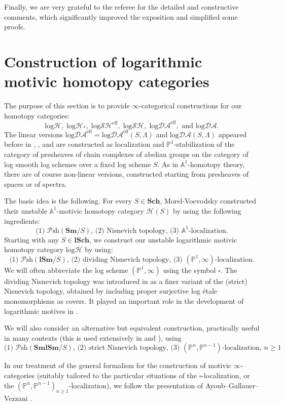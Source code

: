 \documentclass[11pt, a4paper]{amsart}
\theoremstyle{definition}
\numberwithin{equation}{subsection}
\renewcommand{\P}{\mathbb{P}}
\newcommand{\A}{\mathbb{A}}
\newcommand{\Sch}{\mathbf{Sch}}
\newcommand{\lSch}{\mathbf{lSch}}
\newcommand{\Sm}{\mathbf{Sm}}
\newcommand{\lSm}{\mathbf{lSm}}
\newcommand{\SmlSm}{\mathbf{SmlSm}}
\newcommand{\boxx}{\square}
\newcommand{\infPsh}{\mathcal{P}\mathrm{sh}}
\newcommand{\infH}{\mathcal{H}}
\newcommand{\inflogH}{\mathrm{log}\mathcal{H}}
\newcommand{\inflogHpt}{\mathrm{log}\mathcal{H}_\ast}
\newcommand{\inflogSH}{\mathrm{log}\mathcal{SH}}
\newcommand{\inflogSHS}{\mathrm{log}\mathcal{SH}^{\mathrm{eff}}}
\newcommand{\inflogDA}{\mathrm{log}\mathcal{DA}}
\newcommand{\inflogDAeff}{\mathrm{log}\mathcal{DA}^{\mathrm{eff}}}
\begin{document}
Finally, we are very grateful to the referee for the detailed and constructive comments, 
which significantly improved the exposition and simplified some proofs.

\newpage




\section{Construction of logarithmic motivic homotopy categories}
\label{section:colmhc}
The purpose of this section is to provide $\infty$-categorical constructions 
for our homotopy categories:
\[
\inflogH,
\;
\inflogHpt,
\;
\inflogSHS, 
\;
\inflogSH,
\;
\inflogDAeff,
\text{ and }
\inflogDA.
\]
The linear versions $\inflogDAeff= \inflogDAeff(S, \Lambda)$ and $\inflogDA(S, \Lambda)$ appeared before in
\cite{logDM}, \cite{BLPO}, and are constructed as localization and $\P^1$-stabilization of the category of presheaves of chain complexes of abelian groups on the category of log smooth log schemes over a fixed log scheme $S$. As in $\A^1$-homotopy theory, there are of course non-linear versions, constructed starting from presheaves of spaces or of spectra. 

The basic idea is the following. For every $S\in \Sch$, 
Morel-Voevodsky \cite{MV} constructed their unstable $\A^1$-motivic homotopy category $\infH(S)$ 
by using the following ingredients:
\[
\text{(1) $\infPsh(\Sm/S)$, (2) Nisnevich topology, (3) $\A^1$-localization}.
\]
Starting with any $S\in \lSch$, 
we construct our unstable logarithmic motivic homotopy category $\inflogH$ by using:
\[
\text{(1) $\infPsh(\lSm/S)$, (2) dividing Nisnevich topology, (3) $(\P^1, \infty)$-localization}.
\]
We will often abbreviate the log scheme $(\P^1, \infty)$ using the symbol $\boxx$. 
The dividing Nisnevich topology was introduced in \cite[Definition 3.1.4]{logDM} as a finer variant of the (strict) Nisnevich topology, obtained by including proper surjective log \'etale monomorphisms as covers.
It played an important role in the development of logarithmic motives in \cite[\S 7]{logDM}.

We will also consider an alternative but equivalent construction, practically useful in many contexts (this is used extensively in \cite{BLPO} and \cite{BLMP}), using 
\[
\text{(1) $\infPsh(\SmlSm/S)$, (2) strict Nisnevich topology, (3) $(\P^n, \P^{n-1})$-localization, $n\geq 1$}.
\]

In our treatment of the general formalism for the construction of motivic $\infty$-categories (suitably tailored to the particular situations of the $\boxx$-localization, or the $(\P^n, \P^{n-1})_{n\geq 1}$-localization), we follow the presentation of Ayoub--Gallauer--Vezzani \cite{AGV}.
\end{document}
